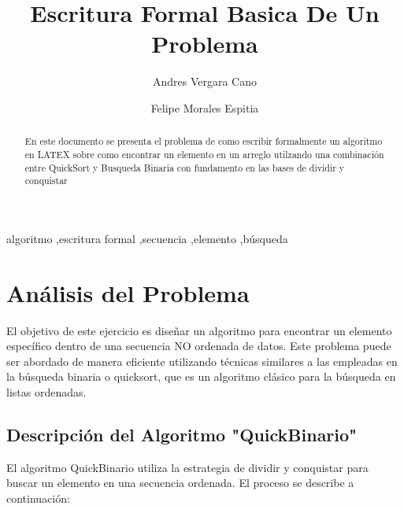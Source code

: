 \documentclass[twoside,spanish]{elsarticle}
\begin{document}
\begin{frontmatter}

\title{Escritura Formal Basica De Un Problema}


\author[lfv]{Andres Vergara Cano}


\author[fdt]{Felipe Morales Espitia}



\address[lfv]{Pontificia Universidad Javeriana, Bogotá, Colombia}

\begin{abstract}
En este documento se presenta el problema de como escribir formalmente un algoritmo en LATEX sobre como encontrar un elemento en un arreglo utilzando una combinación entre QuickSort y Busqueda Binaria con fundamento en las bases de dividir y conquistar
\end{abstract}

\begin{keyword}
algoritmo \sep escritura formal \sep secuencia \sep elemento \sep búsqueda
\end{keyword}

\end{frontmatter}

\section*{Análisis del Problema}

El objetivo de este ejercicio es diseñar un algoritmo para encontrar un elemento específico dentro de una secuencia NO ordenada de datos. Este problema puede ser abordado de manera eficiente utilizando técnicas similares a las empleadas en la búsqueda binaria o quicksort, que es un algoritmo clásico para la búsqueda en listas ordenadas.

\subsection*{Descripción del Algoritmo "QuickBinario"}

El algoritmo QuickBinario utiliza la estrategia de dividir y conquistar para buscar un elemento en una secuencia ordenada. El proceso se describe a continuación:
\end{document}
